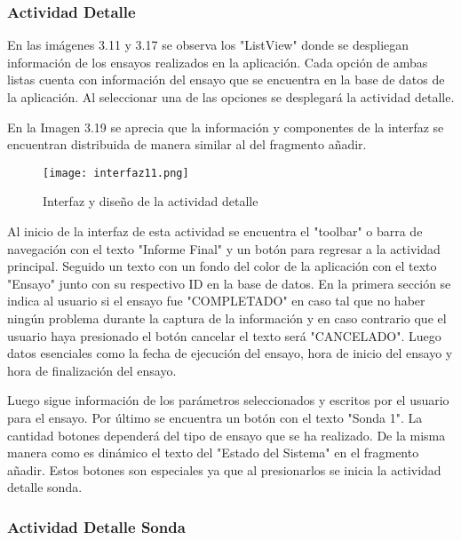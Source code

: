 \subsubsection{Actividad Detalle}

\par 
En las imágenes 3.11 y 3.17 se observa los "ListView" donde se despliegan información de los ensayos realizados en la aplicación. Cada opción de ambas listas cuenta con información del ensayo que se encuentra en la base de datos de la aplicación. Al seleccionar una de las opciones se desplegará la actividad detalle. 

\par \noindent
En la Imagen 3.19 se aprecia que la información y componentes de la interfaz se encuentran distribuida de manera similar al del fragmento añadir.

\begin{figure}[H]
	\centering
	\texttt{[image: interfaz11.png]}
	\caption{Interfaz y diseño de la actividad detalle}
\end{figure}

\par \noindent
Al inicio de la interfaz de esta actividad se encuentra el "toolbar" o barra de navegación con el texto "Informe Final" y un botón para regresar a la actividad principal. Seguido un texto con un fondo del color de la aplicación con el texto "Ensayo" junto con su respectivo ID en la base de datos. En la primera sección se indica al usuario si el ensayo fue "COMPLETADO" en caso tal que no haber ningún problema durante la captura de la información y en caso contrario que el usuario haya presionado el botón cancelar el texto será "CANCELADO". Luego datos esenciales como la fecha de ejecución del ensayo, hora de inicio del ensayo y hora de finalización del ensayo.

\par \noindent
Luego sigue información de los parámetros seleccionados y escritos por el usuario para el ensayo. Por último se encuentra un botón con el texto "Sonda 1". La cantidad botones dependerá del tipo de ensayo que se ha realizado. De la misma manera como es dinámico el texto del "Estado del Sistema" en el fragmento añadir. Estos botones son especiales ya que al presionarlos se inicia la actividad detalle sonda.

\subsubsection{Actividad Detalle Sonda}

